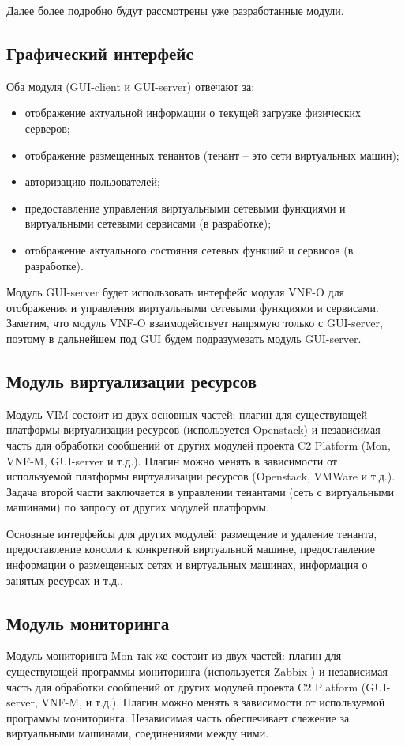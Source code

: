 \documentclass[oneside,final,14pt,a4paper]{extreport}
\begin{document}
Далее более подробно будут рассмотрены уже разработанные модули.

\subsection{Графический интерфейс}
Оба модуля (GUI-client и GUI-server) отвечают за:
\begin{itemize}
	\item отображение актуальной информации о текущей загрузке физических серверов;
	\item отображение размещенных тенантов (тенант -- это сети виртуальных машин);
	\item авторизацию пользователей;
	\item предоставление управления виртуальными сетевыми функциями и виртуальными сетевыми сервисами (в разработке);
	\item отображение актуального состояния сетевых функций и сервисов (в разработке).
\end{itemize}

Модуль GUI-server будет использовать интерфейс модуля VNF-O для отображения и управления виртуальными сетевыми функциями и сервисами. Заметим, что модуль VNF-O взаимодействует напрямую только с GUI-server, поэтому в дальнейшем под GUI будем подразумевать модуль GUI-server.

\subsection{Модуль виртуализации ресурсов}
Модуль VIM состоит из двух основных частей: плагин для существующей платформы виртуализации ресурсов (используется Openstack) и независимая часть для обработки сообщений от других модулей проекта C2 Platform (Mon, VNF-M, GUI-server и т.д.). Плагин можно менять в зависимости от используемой платформы виртуализации ресурсов (Openstack, VMWare и т.д.). Задача второй части заключается в управлении тенантами (сеть с виртуальными машинами) по запросу от других модулей платформы. 

Основные интерфейсы для других модулей: размещение и удаление тенанта, предоставление консоли к конкретной виртуальной машине, предоставление информации о размещенных сетях и виртуальных машинах, информация о занятых ресурсах и т.д..

\subsection{Модуль мониторинга}
Модуль мониторинга Mon так же состоит из двух частей: плагин для существующей программы мониторинга (используется Zabbix \cite{bib:zabbix}) и независимая часть для обработки сообщений от других модулей проекта C2 Platform (GUI-server, VNF-M, и т.д.). Плагин можно менять в зависимости от используемой программы мониторинга. Независимая часть обеспечивает слежение за виртуальными машинами, соединениями между ними.
\end{document}
